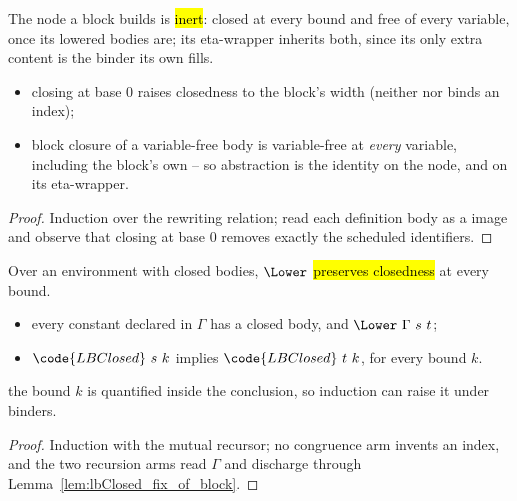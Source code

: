\begin{lemma}
\label{lem:lbClosed_fix_of_block}
\leanok
{}
 The  node a block builds is \hl{inert}: closed at every bound and free of
every variable, once its lowered bodies are; its eta-wrapper inherits both, since its only extra
content is the binder its own  fills.
\begin{itemize}
\item closing at base $0$ raises closedness to the block's width (neither  nor 
binds an index);
\item block closure of a variable-free body is variable-free at \emph{every} variable, including the
block's own -- so abstraction is the identity on the  node, and on its eta-wrapper.
\end{itemize}
\end{lemma}
\begin{proof}
\leanok
{}
 Induction over the rewriting relation; read each definition body as a 
image and observe that closing at base $0$ removes exactly the scheduled identifiers.
\end{proof}

\begin{proposition}
\label{prop:Lower-closed}
\leanok
{}
 Over an environment with closed bodies, $\Lower$ \hl{preserves closedness} at every
bound.
\begin{itemize}
\item {} every constant declared in $\Gamma$ has a closed body, and $\Lower\ \Gamma\ s\ t$;
\item {} $\code{LBClosed}\ s\ k$ implies $\code{LBClosed}\ t\ k$, for every bound $k$.
\end{itemize}
 the bound $k$ is quantified inside the conclusion, so induction can raise it under binders.
\end{proposition}
\begin{proof}
\leanok
{}
 Induction with the mutual recursor; no congruence arm invents an index, and the two
recursion arms read $\Gamma$ and discharge through Lemma~\ref{lem:lbClosed_fix_of_block}.
\end{proof}

